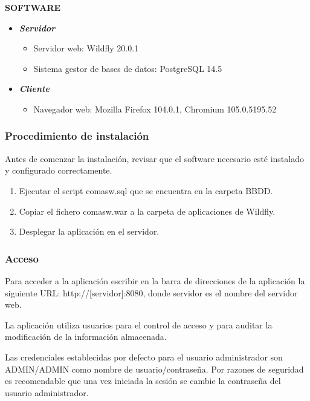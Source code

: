 \textbf{SOFTWARE}\newline

\begin{itemize}
	\item \textit{\textbf{Servidor}}
	\begin{itemize}
		\item Servidor web: Wildfly 20.0.1
		\item Sistema gestor de bases de datos: PostgreSQL 14.5
	\end{itemize}

	\item \textit{\textbf{Cliente}}
	\begin{itemize}
		\item Navegador web: Mozilla Firefox 104.0.1, Chromium 105.0.5195.52
	\end{itemize}
\end{itemize}


\subsubsection{Procedimiento de instalación}
\label{sub:proceso-instalacion}

Antes de comenzar la instalación, revisar que el software necesario esté instalado
y configurado correctamente.
\begin{enumerate}
\item Ejecutar el script comasw.sql que se encuentra en la carpeta BBDD.
\item Copiar el fichero comasw.war a la carpeta de aplicaciones de Wildfly.
\item Desplegar la aplicación en el servidor.
\end{enumerate}
 
 
\subsubsection{Acceso}
\label{sub:acceso-administrador}
 
Para acceder a la aplicación escribir en la barra de direcciones de la aplicación la
siguiente URL: http://[servidor]:8080, donde servidor es el nombre del servidor web.

La aplicación utiliza usuarios para el control de acceso y para auditar la
modificación de la información almacenada.

Las credenciales establecidas por defecto para el usuario administrador son ADMIN/ADMIN como nombre de usuario/contraseña. Por razones de seguridad es recomendable que una vez iniciada la sesión se cambie la contraseña del usuario administrador.
 
